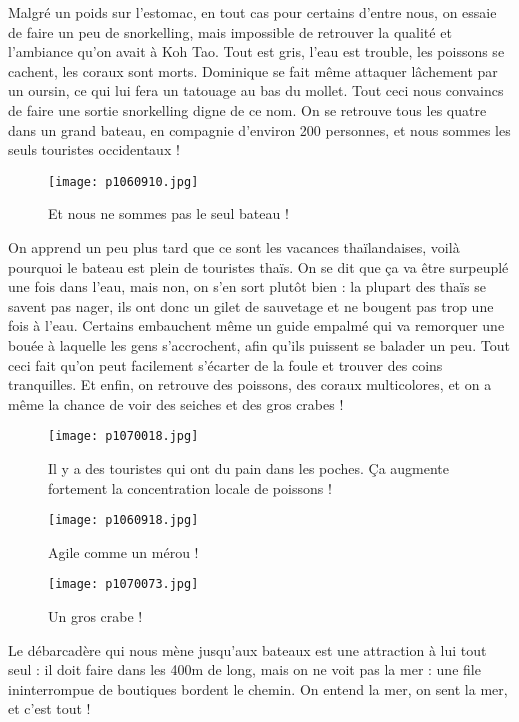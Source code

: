 \documentclass{book}
\begin{document}
Malgré un poids sur l'estomac, en tout cas pour certains d'entre nous, on essaie de faire un peu de snorkelling, mais impossible de retrouver la qualité et l'ambiance qu'on avait à Koh Tao. Tout est gris, l'eau est trouble, les poissons se cachent, les coraux sont morts. Dominique se fait même attaquer lâchement par un oursin, ce qui lui fera un tatouage au bas du mollet. Tout ceci nous convaincs de faire une sortie snorkelling digne de ce nom. On se retrouve tous les quatre dans un grand bateau, en compagnie d'environ 200 personnes, et nous sommes les seuls touristes occidentaux !


\begin{figure}[h]
\centering
\texttt{[image: p1060910.jpg]}
\caption*{Et nous ne sommes pas le seul bateau !}
\end{figure}

On apprend un peu plus tard que ce sont les vacances thaïlandaises, voilà pourquoi le bateau est plein de touristes thaïs. On se dit que ça va être surpeuplé une fois dans l'eau, mais non, on s'en sort plutôt bien : la plupart des thaïs se savent pas nager, ils ont donc un gilet de sauvetage et ne bougent pas trop une fois à l'eau. Certains embauchent même un guide empalmé qui va remorquer une bouée à laquelle les gens s'accrochent, afin qu'ils puissent se balader un peu. Tout ceci fait qu'on peut facilement s'écarter de la foule et trouver des coins tranquilles. Et enfin, on retrouve des poissons, des coraux multicolores, et on a même la chance de voir des seiches et des gros crabes !


\begin{figure}[h]
\centering
\texttt{[image: p1070018.jpg]}
\caption*{Il y a des touristes qui ont du pain dans les poches. Ça augmente fortement la concentration locale de poissons !}
\end{figure}


\begin{figure}[h]
\centering
\texttt{[image: p1060918.jpg]}
\caption*{Agile comme un mérou !}
\end{figure}


\begin{figure}[h]
\centering
\texttt{[image: p1070073.jpg]}
\caption*{Un gros crabe !}
\end{figure}

Le débarcadère qui nous mène jusqu'aux bateaux est une attraction à lui tout seul : il doit faire dans les 400m de long, mais on ne voit pas la mer : une file ininterrompue de boutiques bordent le chemin. On entend la mer, on sent la mer, et c'est tout !
\end{document}
